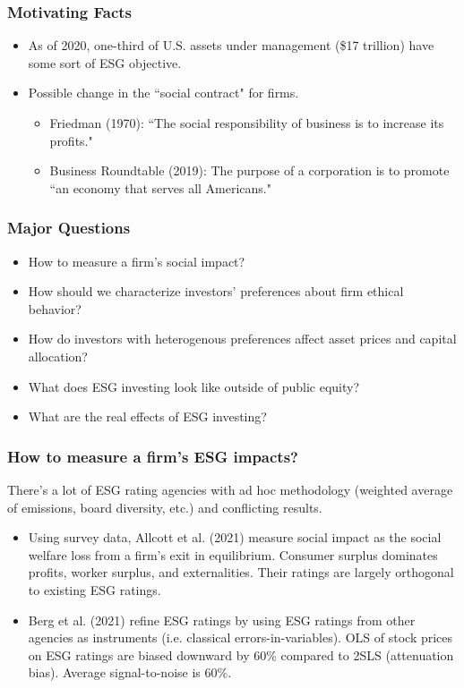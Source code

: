 \documentclass[handout]{beamer}
\begin{document}
\begin{frame}
\frametitle{Motivating Facts}
\begin{itemize}[<+->]
\item As of 2020, one-third of U.S. assets under management (\$17 trillion) have some sort of ESG objective.
\bigskip
\item Possible change in the ``social contract" for firms.
\begin{itemize}
\item Friedman (1970): ``The social responsibility of business is to increase its profits."
\item Business Roundtable (2019): The purpose of a corporation is to promote ``an economy that serves all Americans."
\end{itemize}
\end{itemize}
\end{frame}



\begin{frame}
\frametitle{Major Questions}
\begin{itemize}[<+->]
\item How to measure a firm's social impact?
\bigskip
\item How should we characterize investors' preferences about firm ethical behavior?
\bigskip
\item How do investors with heterogenous preferences affect asset prices and capital allocation?
\bigskip
\item What does ESG investing look like outside of public equity?
\bigskip
\item What are the real effects of ESG investing?
\end{itemize}
\end{frame}



\begin{frame}
\frametitle{How to measure a firm's ESG impacts?}
There's a lot of ESG rating agencies with ad hoc methodology (weighted average of emissions, board diversity, etc.) and conflicting results.
\bigskip
\begin{itemize}[<+->]
\item Using survey data, Allcott et al. (2021) measure social impact as the social welfare loss from a firm's exit in equilibrium. Consumer surplus dominates profits, worker surplus, and externalities. Their ratings are largely orthogonal to existing ESG ratings.
\bigskip
\item Berg et al. (2021) refine ESG ratings by using ESG ratings from other agencies as instruments (i.e. classical errors-in-variables). OLS of stock prices on ESG ratings are biased downward by 60\% compared to 2SLS (attenuation bias). Average signal-to-noise is 60\%.
\end{itemize}
\end{frame}
\end{document}
